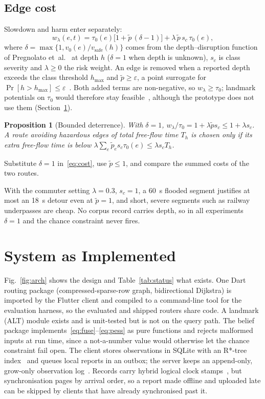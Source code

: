 \documentclass[conference]{IEEEtran}
\newtheorem{proposition}{Proposition}
\begin{document}
\subsection{Edge cost}
Slowdown and harm enter separately:
\begin{equation}
w_\lambda(e,t)=\tau_0(e)\big[1+\tilde p\,(\delta-1)\big] + \lambda\,\tilde p\,s_c\,\tau_0(e), \label{eq:cost}
\end{equation}
where $\delta=\max\{1, v_0(e)/v_{\mathrm{safe}}(h)\}$ comes from the depth--disruption function of Pregnolato et~al.~\cite{pregnolato2017depth} at depth $h$ ($\delta=1$ when depth is unknown), $s_c$ is class severity and $\lambda\ge0$ the risk weight. An edge is removed when a reported depth exceeds the class threshold $h_{\max}$ and $\tilde p\ge\varepsilon$, a point surrogate for $\Pr[h>h_{\max}]\le\varepsilon$~\cite{charnes1959chance}. Both added terms are non-negative, so $w_\lambda\ge\tau_0$; landmark potentials on $\tau_0$ would therefore stay feasible~\cite{delling2007landmark}, although the prototype does not use them (Section~\ref{sec:system}).

\begin{proposition}[Bounded deterrence]\label{prop:cap}
With $\delta=1$, $w_\lambda/\tau_0=1+\lambda\tilde p s_c\le1+\lambda s_c$. A route avoiding hazardous edges of total free-flow time $T_h$ is chosen only if its extra free-flow time is below $\lambda\sum_e\tilde p_e s_c\tau_0(e)\le\lambda s_cT_h$.
\end{proposition}
\begin{IEEEproof}
Substitute $\delta=1$ in~\eqref{eq:cost}, use $\tilde p\le1$, and compare the summed costs of the two routes.
\end{IEEEproof}
With the commuter setting $\lambda=0.3$, $s_c=1$, a 60~s flooded segment justifies at most an 18~s detour even at $\tilde p=1$, and short, severe segments such as railway underpasses are cheap. No corpus record carries depth, so in all experiments $\delta=1$ and the chance constraint never fires.

\section{System as Implemented}\label{sec:system}
Fig.~\ref{fig:arch} shows the design and Table~\ref{tab:status} what exists. One Dart routing package (compressed-sparse-row graph, bidirectional Dijkstra) is imported by the Flutter client and compiled to a command-line tool for the evaluation harness, so the evaluated and shipped routers share code. A landmark (ALT) module exists and is unit-tested but is not on the query path. The belief package implements~\eqref{eq:fuse}--\eqref{eq:pess} as pure functions and rejects malformed inputs at run time, since a not-a-number value would otherwise let the chance constraint fail open. The client stores observations in SQLite with an R*-tree index~\cite{beckmann1990rstar} and queues local reports in an outbox; the server keeps an append-only, grow-only observation log~\cite{shapiro2011crdt}. Records carry hybrid logical clock stamps~\cite{kulkarni2014hlc}, but synchronisation pages by arrival order, so a report made offline and uploaded late can be skipped by clients that have already synchronised past it.
\end{document}
